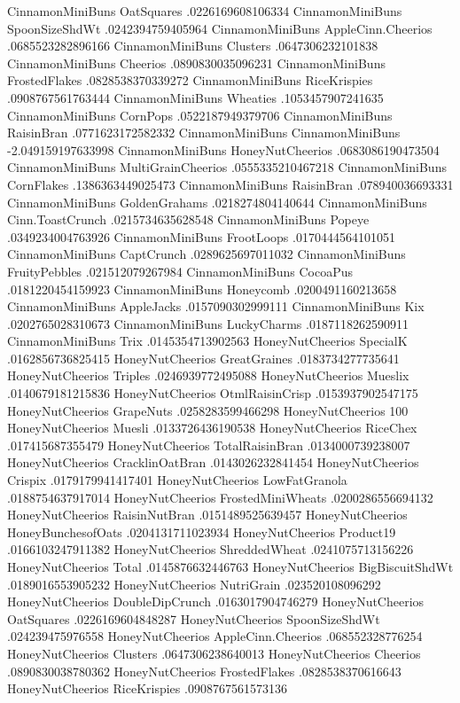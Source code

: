 CinnamonMiniBuns	OatSquares	.0226169608106334
CinnamonMiniBuns	SpoonSizeShdWt	.0242394759405964
CinnamonMiniBuns	AppleCinn.Cheerios	.0685523282896166
CinnamonMiniBuns	Clusters	.0647306232101838
CinnamonMiniBuns	Cheerios	.0890830035096231
CinnamonMiniBuns	FrostedFlakes	.0828538370339272
CinnamonMiniBuns	RiceKrispies	.0908767561763444
CinnamonMiniBuns	Wheaties	.1053457907241635
CinnamonMiniBuns	CornPops	.0522187949379706
CinnamonMiniBuns	RaisinBran	.0771623172582332
CinnamonMiniBuns	CinnamonMiniBuns	-2.049159197633998
CinnamonMiniBuns	HoneyNutCheerios	.0683086190473504
CinnamonMiniBuns	MultiGrainCheerios	.0555335210467218
CinnamonMiniBuns	CornFlakes	.1386363449025473
CinnamonMiniBuns	RaisinBran	.078940036693331
CinnamonMiniBuns	GoldenGrahams	.0218274804140644
CinnamonMiniBuns	Cinn.ToastCrunch	.0215734635628548
CinnamonMiniBuns	Popeye	.0349234004763926
CinnamonMiniBuns	FrootLoops	.0170444564101051
CinnamonMiniBuns	CaptCrunch	.0289625697011032
CinnamonMiniBuns	FruityPebbles	.021512079267984
CinnamonMiniBuns	CocoaPus	.0181220454159923
CinnamonMiniBuns	Honeycomb	.0200491160213658
CinnamonMiniBuns	AppleJacks	.0157090302999111
CinnamonMiniBuns	Kix	.0202765028310673
CinnamonMiniBuns	LuckyCharms	.0187118262590911
CinnamonMiniBuns	Trix	.0145354713902563
HoneyNutCheerios	SpecialK	.0162856736825415
HoneyNutCheerios	GreatGraines	.0183734277735641
HoneyNutCheerios	Triples	.0246939772495088
HoneyNutCheerios	Mueslix	.0140679181215836
HoneyNutCheerios	OtmlRaisinCrisp	.0153937902547175
HoneyNutCheerios	GrapeNuts	.0258283599466298
HoneyNutCheerios	100%
HoneyNutCheerios	Muesli	.0133726436190538
HoneyNutCheerios	RiceChex	.017415687355479
HoneyNutCheerios	TotalRaisinBran	.0134000739238007
HoneyNutCheerios	CracklinOatBran	.0143026232841454
HoneyNutCheerios	Crispix	.0179179941417401
HoneyNutCheerios	LowFatGranola	.0188754637917014
HoneyNutCheerios	FrostedMiniWheats	.0200286556694132
HoneyNutCheerios	RaisinNutBran	.0151489525639457
HoneyNutCheerios	HoneyBunchesofOats	.0204131711023934
HoneyNutCheerios	Product19	.0166103247911382
HoneyNutCheerios	ShreddedWheat	.0241075713156226
HoneyNutCheerios	Total	.0145876632446763
HoneyNutCheerios	BigBiscuitShdWt	.0189016553905232
HoneyNutCheerios	NutriGrain	.023520108096292
HoneyNutCheerios	DoubleDipCrunch	.0163017904746279
HoneyNutCheerios	OatSquares	.0226169604848287
HoneyNutCheerios	SpoonSizeShdWt	.024239475976558
HoneyNutCheerios	AppleCinn.Cheerios	.068552328776254
HoneyNutCheerios	Clusters	.0647306238640013
HoneyNutCheerios	Cheerios	.0890830038780362
HoneyNutCheerios	FrostedFlakes	.0828538370616643
HoneyNutCheerios	RiceKrispies	.0908767561573136
